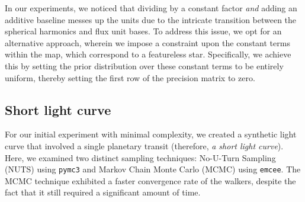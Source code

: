 \documentclass[twocolumn]{aastex631}
\begin{document}
In our experiments, we noticed that dividing by a constant factor \emph{and} adding an additive baseline messes up the units due to the 
intricate transition between the spherical harmonics and flux unit bases. To address this issue, we opt for an alternative approach, wherein we 
impose a constraint upon the constant terms within the map, which correspond to a featureless star. Specifically, we achieve this by setting the prior distribution 
over these constant terms to be entirely uniform, thereby setting the first row of the precision matrix to zero.



\subsection{Short light curve}
For our initial experiment with minimal complexity, we created a synthetic light curve that involved a single planetary transit (therefore, 
\emph{a short light curve}). Here, we examined two distinct sampling techniques: No-U-Turn Sampling (NUTS) using \texttt{pymc3} and Markov Chain Monte Carlo (MCMC) 
using \texttt{emcee}. The MCMC technique exhibited a faster convergence rate of the walkers, despite the fact that it still required a significant amount of time.
\end{document}
